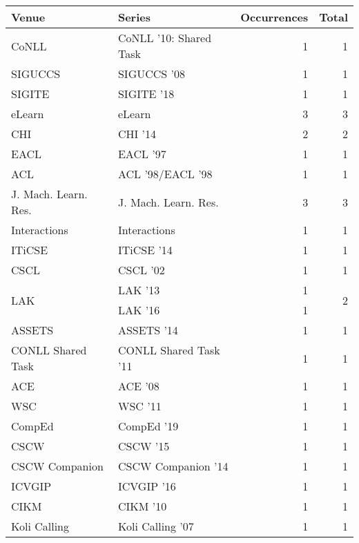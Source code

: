 \begin{table*}[t]
\begin{tabular}{llrr}
Venue & Series & Occurrences & Total\\\hline
\multirow{1}{*}{CoNLL } & CoNLL '10: Shared Task & 1 & \multirow{1}{*}{1}\\
\multirow{1}{*}{SIGUCCS } & SIGUCCS '08 & 1 & \multirow{1}{*}{1}\\
\multirow{1}{*}{SIGITE } & SIGITE '18 & 1 & \multirow{1}{*}{1}\\
\multirow{1}{*}{eLearn} & eLearn & 3 & \multirow{1}{*}{3}\\
\multirow{1}{*}{CHI } & CHI '14 & 2 & \multirow{1}{*}{2}\\
\multirow{1}{*}{EACL } & EACL '97 & 1 & \multirow{1}{*}{1}\\
\multirow{1}{*}{ACL } & ACL '98/EACL '98 & 1 & \multirow{1}{*}{1}\\
\multirow{1}{*}{J. Mach. Learn. Res.} & J. Mach. Learn. Res. & 3 & \multirow{1}{*}{3}\\
\multirow{1}{*}{Interactions} & Interactions & 1 & \multirow{1}{*}{1}\\
\multirow{1}{*}{ITiCSE } & ITiCSE '14 & 1 & \multirow{1}{*}{1}\\
\multirow{1}{*}{CSCL } & CSCL '02 & 1 & \multirow{1}{*}{1}\\
\multirow{2}{*}{LAK } & LAK '13 & 1 & \multirow{2}{*}{2}\\
& LAK '16 & 1 &\\
\multirow{1}{*}{ASSETS } & ASSETS '14 & 1 & \multirow{1}{*}{1}\\
\multirow{1}{*}{CONLL Shared Task } & CONLL Shared Task '11 & 1 & \multirow{1}{*}{1}\\
\multirow{1}{*}{ACE } & ACE '08 & 1 & \multirow{1}{*}{1}\\
\multirow{1}{*}{WSC } & WSC '11 & 1 & \multirow{1}{*}{1}\\
\multirow{1}{*}{CompEd } & CompEd '19 & 1 & \multirow{1}{*}{1}\\
\multirow{1}{*}{CSCW } & CSCW '15 & 1 & \multirow{1}{*}{1}\\
\multirow{1}{*}{CSCW Companion } & CSCW Companion '14 & 1 & \multirow{1}{*}{1}\\
\multirow{1}{*}{ICVGIP } & ICVGIP '16 & 1 & \multirow{1}{*}{1}\\
\multirow{1}{*}{CIKM } & CIKM '10 & 1 & \multirow{1}{*}{1}\\
\multirow{1}{*}{Koli Calling } & Koli Calling '07 & 1 & \multirow{1}{*}{1}\\

\end{tabular}
\end{table*}
